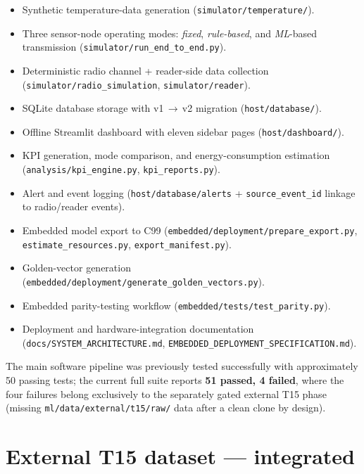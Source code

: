 \documentclass[11pt,a4paper]{article}
\begin{document}
\begin{itemize}[leftmargin=2em,itemsep=2pt]
  \item Synthetic temperature-data generation
        (\texttt{simulator/temperature/}).
  \item Three sensor-node operating modes:
        \emph{fixed}, \emph{rule-based}, and \emph{ML}-based transmission
        (\texttt{simulator/run\_end\_to\_end.py}).
  \item Deterministic radio channel + reader-side data collection
        (\texttt{simulator/radio\_simulation}, \texttt{simulator/reader}).
  \item SQLite database storage with v1\,$\rightarrow$\,v2 migration
        (\texttt{host/database/}).
  \item Offline Streamlit dashboard with eleven sidebar pages
        (\texttt{host/dashboard/}).
  \item KPI generation, mode comparison, and energy-consumption estimation
        (\texttt{analysis/kpi\_engine.py}, \texttt{kpi\_reports.py}).
  \item Alert and event logging
        (\texttt{host/database/alerts} + \texttt{source\_event\_id}
        linkage to radio/reader events).
  \item Embedded model export to C99
        (\texttt{embedded/deployment/prepare\_export.py},
        \texttt{estimate\_resources.py}, \texttt{export\_manifest.py}).
  \item Golden-vector generation
        (\texttt{embedded/deployment/generate\_golden\_vectors.py}).
  \item Embedded parity-testing workflow
        (\texttt{embedded/tests/test\_parity.py}).
  \item Deployment and hardware-integration documentation
        (\texttt{docs/SYSTEM\_ARCHITECTURE.md},
        \texttt{EMBEDDED\_DEPLOYMENT\_SPECIFICATION.md}).
\end{itemize}

The main software pipeline was previously tested successfully with
approximately 50 passing tests; the current full suite reports
\textbf{51 passed, 4 failed}, where the four failures belong exclusively
to the separately gated external T15 phase (missing
\texttt{ml/data/external/t15/raw/} data after a clean clone by design).

\section{External T15 dataset --- integrated}
\end{document}

